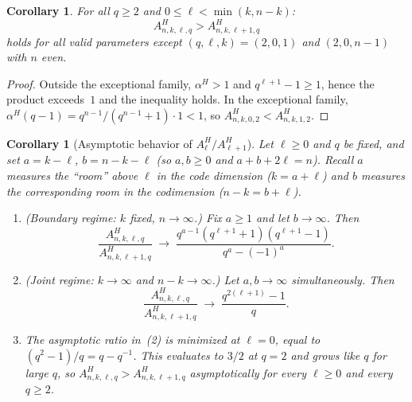\documentclass[11pt]{article}
\theoremstyle{plain}
\newtheorem{corollary}[theorem]{Corollary}
\theoremstyle{remark}
\begin{document}
\begin{corollary}\label{cor:Amonotone}
For all $q \geq 2$ and $0\leq\ell<\min(k, n-k)$:
\[
  A^H_{n,k,\ell,q} > A^H_{n,k,\ell+1,q}
\]
holds for all valid parameters except $(q, \ell, k) = (2, 0, 1)$ and $(2, 0, n-1)$ with $n$ even.
\end{corollary}

\begin{proof}
Outside the exceptional family, $\alpha^H > 1$ and $q^{\ell+1}-1 \geq 1$, hence the product
exceeds~$1$ and the inequality holds.
In the exceptional family, $\alpha^H(q-1) = q^{n-1}/(q^{n-1}+1) \cdot 1 < 1$,
so $A^H_{n,k,0,2} < A^H_{n,k,1,2}$.
\end{proof}

\begin{corollary}[Asymptotic behavior of $A^H_\ell / A^H_{\ell+1}$]\label{cor:alpha-herm-asym}
Let $\ell \geq 0$ and $q$ be fixed, and set $a = k - \ell$, $b = n - k - \ell$
(so $a, b \geq 0$ and $a + b + 2\ell = n$). Recall $a$ measures the
``room'' above $\ell$ in the code dimension ($k = a + \ell$) and $b$ measures
the corresponding room in the codimension ($n - k = b + \ell$).
\begin{enumerate}
\item (\emph{Boundary regime: $k$ fixed, $n \to \infty$.})
Fix $a \geq 1$ and let $b \to \infty$. Then
\[
  \frac{A^H_{n,k,\ell,q}}{A^H_{n,k,\ell+1,q}}
  \;\longrightarrow\; \frac{q^{a-1}(q^{\ell+1}+1)(q^{\ell+1}-1)}{q^a - (-1)^a}.
\]
\item (\emph{Joint regime: $k \to \infty$ and $n - k \to \infty$.})
Let $a, b \to \infty$ simultaneously. Then
\[
  \frac{A^H_{n,k,\ell,q}}{A^H_{n,k,\ell+1,q}}
  \;\longrightarrow\; \frac{q^{2(\ell+1)} - 1}{q}.
\]
\item The asymptotic ratio in~(2) is minimized at $\ell = 0$, equal to
$(q^2 - 1)/q = q - q^{-1}$. This evaluates to $3/2$ at $q = 2$ and grows
like $q$ for large $q$, so $A^H_{n,k,\ell,q} > A^H_{n,k,\ell+1,q}$
asymptotically for every $\ell \geq 0$ and every $q \geq 2$.
\end{enumerate}
\end{corollary}
\end{document}
